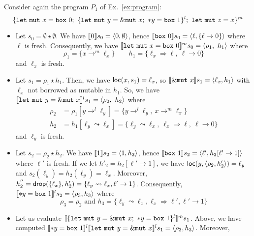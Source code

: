 \begin{example}
  Consider again the program $P_1$ of Ex.~\ref{ex:program}:
  \[
    \{
      \mathtt{let\ mut}\ x = \mathtt{box}\ 0;\
      \{\mathtt{let\ mut}\ y = \mutborrow x;\
      \mathtt{*}y = \mathtt{box}\ 1\}^l;\
      \mathtt{let\ mut}\ z = x
    \}^m
  \]
  \begin{itemize}
    \item Let $s_0=\emptyset \star \emptyset$.
    We have $\den[0]{s_0} = \langle 0,\emptyset\rangle$, hence
    $\den[\mathtt{box}\ 0]{s_0} =
    \langle\ell,\{\ell\to 0\}\rangle$ where $\ell$ is fresh.
    Consequently, we have
    $\denl[\mathtt{let\ mut}\ x = \mathtt{box}\ 0]{m}{s_0} =
    \langle \rho_1,\ h_1\rangle$ where
    \[\rho_1=\{x\to^m\ell_x\} \qquad
    h_1 = \{\ell_x\Rightarrow \ell,\ \ell\to 0\}\]
    and $\ell_x$ is fresh.
    \item Let $s_1 = \rho_1 \star h_1$.
    Then, we have $\loc(x,s_1) = \ell_x$, so
    $\den[\mutborrow x]{s_1} = \langle\ell_x, h_1\rangle$
    with $\ell_x$ not borrowed as mutable in $h_1$.
    So, we have
    $\denl[\mathtt{let\ mut}\ y = \mutborrow x]{l}{s_1} =
    \langle \rho_2,\ h_2\rangle$
    where
    \begin{align*}
      \rho_2 & = \rho_1[y\to^l\ell_y] = \{y\to^l\ell_y,\ x\to^m\ell_x\}\\
      h_2 & = h_1[\ell_y\leadsto \ell_x] =
      \{\ell_y\leadsto \ell_x,\ \ell_x\Rightarrow \ell,\ \ell\to 0\}
    \end{align*}
    and $\ell_y$ is fresh.
    \item Let $s_2 = \rho_2 \star h_2$.
    We have $\den[1]{s_2} = \langle 1,h_2\rangle$, hence
    $\den[\mathtt{box}\ 1]{s_2} =
    \langle\ell',h_2[\ell'\to 1]\rangle$ where $\ell'$ is fresh.
    If we let $h'_2 = h_2[\ell'\to 1]$,
    we have $\loc(y,\langle\rho_2,h'_2\rangle) = \ell_y$ and
    $s_2(\ell_y) = h_2(\ell_y) = \ell_x$.
    Moreover, $h^{''}_2=\drop(\{\ell_x\},h'_2) =
    \{\ell_y\leadsto \ell_x,\ell'\to 1\}$. Consequently,
    $\denl[\mathtt{*}y = \mathtt{box}\ 1]{l}{s_2} =
    \langle\rho_3,h_3\rangle$ where
    \[\rho_3 = \rho_2
    \text{ and }
    h_3 = \{\ell_y\leadsto\ell_x,\ell_x\Rightarrow\ell',
    \ell'\to 1\}\]
    \item Let us evaluate
    $\denl[\{\mathtt{let\ mut}\ y = \mutborrow x;\
    \mathtt{*}y = \mathtt{box}\ 1\}^l]{m}{s_1}$. Above, we have
    computed $\denl[\mathtt{*}y = \mathtt{box}\ 1]{l}{
    \denl[\mathtt{let\ mut}\ y = \mutborrow x]{l}{s_1}} =
    \langle\rho_3,h_3\rangle$. Moreover,

\end{itemize}
\end{example}
